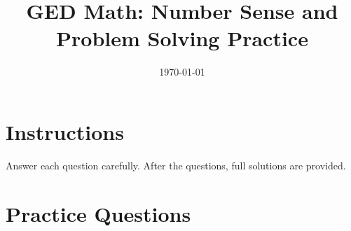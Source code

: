 \documentclass[12pt]{article}
\title{GED Math: Number Sense and Problem Solving Practice}
\date{\today}
\begin{document}
\maketitle

\section*{Instructions}
Answer each question carefully. After the questions, full solutions are provided.


\section*{Practice Questions}
\end{document}

